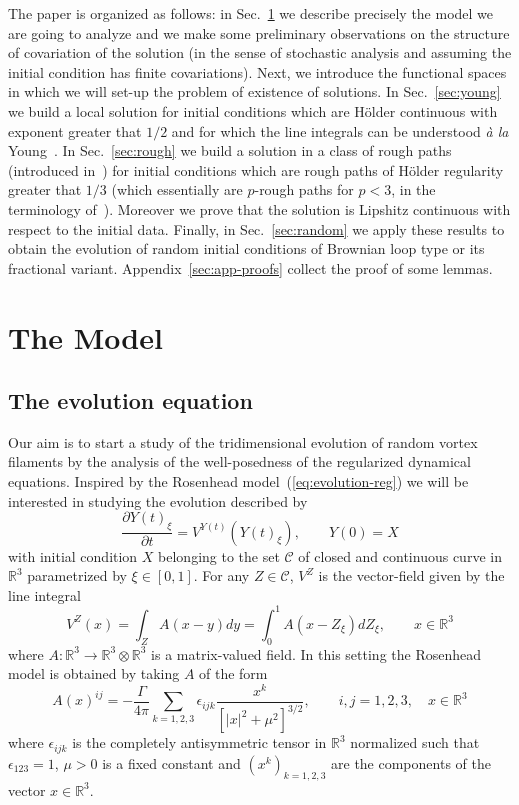 \documentclass[a4paper,12pt,reqno]{amsart}
\newcommand{\RR}{\mathbb{R}^3}
\newcommand{\CC}{\mathscr{C}}
\begin{document}
The paper is organized as follows: in Sec.~\ref{sec:model} we describe
precisely the model we are going to analyze and we make some
preliminary observations on the structure of covariation  of the
solution (in the
sense of stochastic analysis and assuming the initial condition has
finite covariations). 
Next, we introduce the functional spaces in which we will set-up
the problem of existence of solutions. In Sec.~\ref{sec:young} we
build a local solution for initial conditions which are H\"older
continuous with exponent greater that $1/2$ and for which the line
integrals can be understood \emph{\`a la} Young~\cite{young}. In
Sec.~\ref{sec:rough} we build a solution in a class of rough paths
(introduced in~\cite{Gubinelli}) for initial conditions which are
rough paths of H\"older regularity greater that $1/3$ (which
essentially are $p$-rough paths for $p < 3$, in the terminology
of~\cite{LyonsBook}). Moreover we prove that the solution is Lipshitz
continuous with respect to the initial data. 
Finally, in Sec.~\ref{sec:random} we apply these
results to obtain the evolution of random initial
conditions of Brownian loop type or its fractional
variant. 
Appendix~\ref{sec:app-proofs} collect the proof of some lemmas.






\section{The Model}
\label{sec:model}
\subsection{The evolution  equation}
Our aim is to start a study of the  tridimensional evolution of
random vortex filaments by the analysis of the well-posedness of the
regularized dynamical equations.
Inspired by the Rosenhead model~(\ref{eq:evolution-reg}) we will be
 interested in studying the  evolution described by
\begin{equation}
  \label{eq:evolution}
\frac{\partial Y(t)_\xi}{\partial t} = V^{Y(t)}(Y(t)_\xi), \qquad Y(0)
= X
\end{equation}
with initial condition $X$ belonging to the set $\CC$ of  closed and
continuous curve in $\RR$ parametrized by $\xi \in [0,1]$. For any $Z
\in \CC$,  $V^{Z}$ is the vector-field given by the line integral
\begin{equation}
  \label{eq:evolutionV}
  V^{Z}(x) = \int_Z A(x-y) dy = \int_0^1 A(x-Z_\xi) dZ_\xi, \qquad x \in \mathbb{R}^3
\end{equation}
where $A : \RR \to \RR \otimes \RR$ is a matrix-valued field.
In this setting the Rosenhead model is obtained by taking $A$ of the form
$$
A(x)^{ij} = -\frac{\Gamma}{4\pi} \sum_{k=1,2,3} \epsilon_{ijk}
\frac{x^k}{[|x|^2+\mu^2]^{3/2}} 
,\qquad i,j = 1,2,3, \quad x \in \mathbb{R}^3
$$
where $\epsilon_{ijk}$ is the completely antisymmetric tensor in
$\mathbb{R}^3$ normalized such that $\epsilon_{123}=1$, $\mu > 0$ is a
fixed constant and $(x^k)_{k=1,2,3}$ are the components of the vector $x
\in \mathbb{R}^3$.
\end{document}
